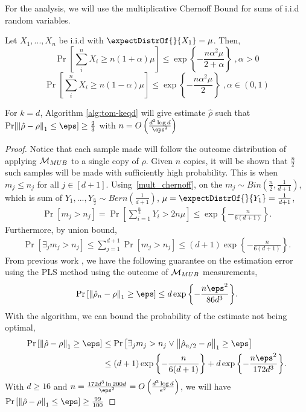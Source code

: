 For the analysis, we will use the multiplicative Chernoff Bound for sums of i.i.d random variables.
\begin{lemma}
    \label{mult_chernoff}
   Let $X_1, ..., X_n$ be i.i.d with $\expectDistrOf{}{X_1} = \mu$. Then, 
   $$\Pr\left[\sum_{i}^n X_i \geq n(1+\alpha)\mu\right] \leq \exp{\left\{-\frac{n \alpha^2 \mu}{2 + \alpha}\right\}}\;, \alpha > 0$$ 
   $$\Pr\left[\sum_{i}^n X_i \geq n(1-\alpha)\mu\right] \leq \exp{\left\{-\frac{n \alpha^2 \mu}{2}\right\}}\;, \alpha \in (0,1)$$ 
\end{lemma}
\begin{theorem} \label{thm_keqd}
    For $k=d$, Algorithm \cref{alg:tom-keqd} will give estimate $\hat{\rho}$ such that $\Pr[\tracenorm{\hat{\rho} - \rho} \leq \eps] \geq \frac{2}{3}$ with $n = O\left( \frac{d^3 \log d}{\eps^2}\right)$
\end{theorem}
\begin{proof}
Notice that each sample made will follow the outcome distribution of applying $\mathcal{M}_{MUB}$ to a single copy of $\rho$. 
Given $n$ copies, it will be shown that $\frac{n}{2}$ such samples will be made with sufficiently high probability. This is when $m_j \leq n_j$ for all $j \in [d+1]$. 
Using~\cref{mult_chernoff}, on the $m_j \sim Bin(\frac{n}{2}, \frac{1}{d+1})$, which is sum of $Y_1,...,Y_{\frac{n}{2}} \sim Bern(\frac{1}{d+1})$, $\mu = \expectDistrOf{}{Y_1} = \frac{1}{d+1}$,
\begin{align*}
    \Pr\left[m_j > n_j\right] = \Pr\left[\sum_{i=1}^\frac{n}{2} Y_i > 2 n \mu \right] \leq \exp{\left\{-\frac{n}{6(d+1)}\right\}}.
\end{align*}
Furthermore, by union bound,
\begin{align*}
    \Pr\left[\exists_j m_j > n_j\right] \leq \sum_{j=1}^{d+1} \Pr\left[m_j > n_j\right] \leq (d+1) \exp{\left\{-\frac{n}{6(d+1)}\right\}}.
\end{align*}
From previous work \cite{guctua2020fast}, we have the following guarantee on the estimation error using the PLS method using the outcome of $\mathcal{M}_{MUB}$ measurements,
\begin{align*}
    \Pr\left[\tracenorm{\hat{\rho}_n - \rho} \geq \eps \right] \leq d \exp{\left\{-\frac{n \eps^2}{86 d^3}\right\}}.
\end{align*}
With the algorithm, we can bound the probability of the estimate not being optimal,
\begin{align*}
\Pr\left[\tracenorm{\hat{\rho} - \rho} \geq \eps \right] &\leq \Pr\left[\exists_j m_j > n_j \lor \tracenorm{\hat{\rho}_{n/2} - \rho} \geq \eps\right] \\
&\leq (d+1) \exp{\left\{-\frac{n}{6(d+1)}\right\}} + d \exp{\left\{-\frac{n \eps^2}{172 d^3}\right\}}.
\end{align*}
With $d \geq 16$ and $n = \frac{172d^3 \ln{200d}}{\eps^2}  = O\left(\frac{d^3 \log{d}}{e^2} \right)$, we will have $\Pr\left[\tracenorm{\hat{\rho} - \rho} \le \eps \right] \geq \frac{99}{100}$
\end{proof}
